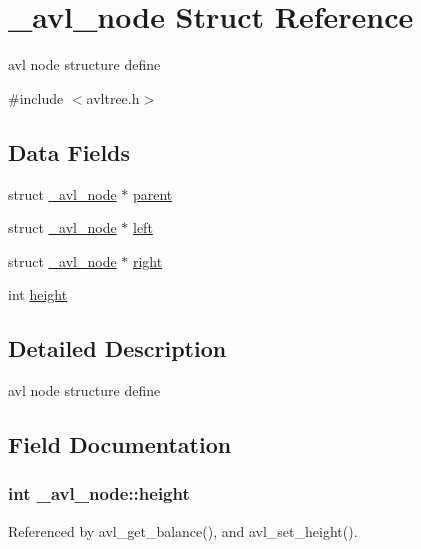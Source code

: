\hypertarget{struct__avl__node}{\section{\-\_\-avl\-\_\-node Struct Reference}
\label{struct__avl__node}
}


avl node structure define  




{\ttfamily \#include $<$avltree.\-h$>$}

\subsection*{Data Fields}
\begin{DoxyCompactItemize}
\item 
struct \hyperlink{struct__avl__node}{\-\_\-avl\-\_\-node} $\ast$ \hyperlink{struct__avl__node_ad568e44f1e071b12670532cddae02e5e}{parent}
\item 
struct \hyperlink{struct__avl__node}{\-\_\-avl\-\_\-node} $\ast$ \hyperlink{struct__avl__node_a814c986617033a95fa0aa814e0f7cc42}{left}
\item 
struct \hyperlink{struct__avl__node}{\-\_\-avl\-\_\-node} $\ast$ \hyperlink{struct__avl__node_a2481d9ea521cc380c32132c7837c9f84}{right}
\item 
int \hyperlink{struct__avl__node_aab1e047a7fc121dd7c3456af040cae3a}{height}
\end{DoxyCompactItemize}


\subsection{Detailed Description}
avl node structure define 

\subsection{Field Documentation}
\hypertarget{struct__avl__node_aab1e047a7fc121dd7c3456af040cae3a}{
\subsubsection[{height}]{\setlength{\rightskip}{0pt plus 5cm}int \-\_\-avl\-\_\-node\-::height}}\label{struct__avl__node_aab1e047a7fc121dd7c3456af040cae3a}


Referenced by avl\-\_\-get\-\_\-balance(), and avl\-\_\-set\-\_\-height().

